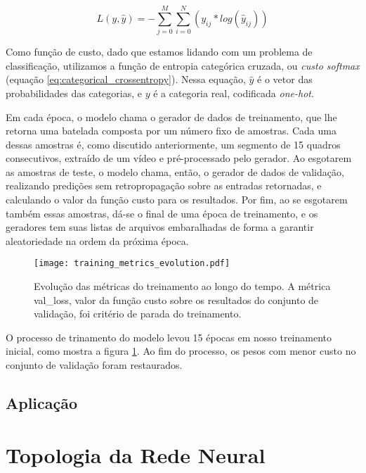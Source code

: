 \begin{equation} \label{eq:categorical_crossentropy}
    L(y,\hat{y})=-\sum\limits_{j=0}^M\sum\limits_{i=0}^N(y_{ij}*log(\hat{y}_{ij}))
\end{equation}

Como função de custo, dado que estamos lidando com um problema de classificação, utilizamos a função de entropia categórica cruzada, ou \textit{custo softmax} (equação \ref{eq:categorical_crossentropy}). Nessa equação, $\hat{y}$ é o vetor das probabilidades das categorias, e $y$ é a categoria real, codificada \textit{one-hot}.

Em cada época, o modelo chama o gerador de dados de treinamento, que lhe retorna uma batelada composta por um número fixo de amostras. Cada uma dessas amostras é, como discutido anteriormente, um segmento de 15 quadros consecutivos, extraído de um vídeo e pré-processado pelo gerador. Ao esgotarem as amostras de teste, o modelo chama, então, o gerador de dados de validação, realizando predições sem retropropagação sobre as entradas retornadas, e calculando o valor da função custo para os resultados. Por fim, ao se esgotarem também essas amostras, dá-se o final de uma época de treinamento, e os geradores tem suas listas de arquivos embaralhadas de forma a garantir aleatoriedade na ordem da próxima época.

\begin{figure}[ht]
    \centering
    \texttt{[image: training\_metrics\_evolution.pdf]}
    \caption{Evolução das métricas do treinamento ao longo do tempo. A métrica val\_loss, valor da função custo sobre os resultados do conjunto de validação, foi critério de parada do treinamento.}
    \label{fig:train_metrics_evo}
\end{figure}

O processo de trinamento do modelo levou 15 épocas em nosso treinamento inicial, como mostra a figura \ref{fig:train_metrics_evo}. Ao fim do processo, os pesos com menor custo no conjunto de validação foram restaurados.

\subsection{Aplicação}
\label{subsec:application}

% 


\section{Topologia da Rede Neural}
\label{sec:topology}

